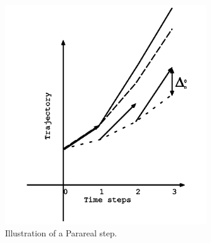 \documentclass[9pt]{beamer}
\begin{document}
\begin{frame}
\begin{columns}
\begin{itemize}
{{{\begin{align*}
\end{align*}}}}
\end{itemize}
\begin{figure}
\includegraphics[scale=0.4]{parareal2.png}
\caption{Illustration of a Parareal step.}
\end{figure}
\end{columns}
\end{frame}
\end{document}
